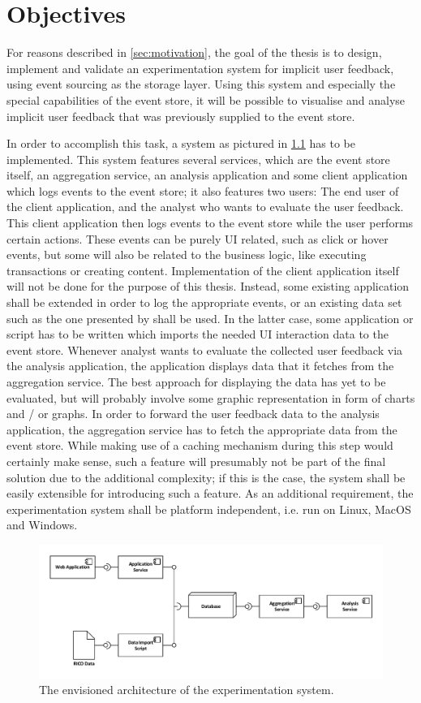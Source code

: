 %
\chapter{Objectives}
\label{sec:objectives}

For reasons described in \cref{sec:motivation}, the goal of the thesis is to design, implement and validate an experimentation system for implicit user feedback, using event sourcing as the storage layer.
Using this system and especially the special capabilities of the event store, it will be possible to visualise and analyse implicit user feedback that was previously supplied to the event store.

In order to accomplish this task, a system as pictured in \cref{fig:system:vision} has to be implemented.
This system features several services, which are the event store itself, an aggregation service, an analysis application and some client application which logs events to  the event store; it also features two users: The end user of the client application, and the analyst who wants to evaluate the user feedback.
This client application then logs events to the event store while the user performs certain actions.
These events can be purely UI related, such as click or hover events, but some will also be related to the business logic, like executing transactions or creating content.
Implementation of the client application itself will not be done for the purpose of this thesis.
Instead, some existing application shall be extended in order to log the appropriate events, or an existing data set such as the one presented by \citet{Deka:2017:Rico} shall be used.
In the latter case, some application or script has to be written which imports the needed UI interaction data to the event store.
Whenever analyst wants to evaluate the collected user feedback via the analysis application, the application displays data that it fetches from the aggregation service.
The best approach for displaying the data has yet to be evaluated, but will probably involve some graphic representation in form of charts and / or graphs.
In order to forward the user feedback data to the analysis application, the aggregation service has to fetch the appropriate data from the event store.
While making use of a caching mechanism during this step would certainly make sense, such a feature will presumably not be part of the final solution due to the additional complexity; if this is the case, the system shall be easily extensible for introducing such a feature.
As an additional requirement, the experimentation system shall be platform independent, i.e. run on Linux, MacOS and Windows.

\begin{figure}[htb]
        \includegraphics[width=\textwidth]{gfx/architecture-1}
        \caption{The envisioned architecture of the experimentation system.}
        \label{fig:system:vision}
\end{figure}

